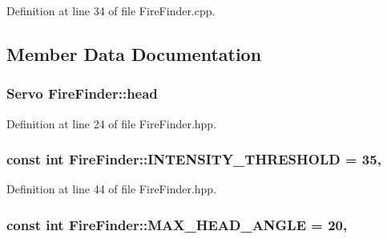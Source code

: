 Definition at line 34 of file Fire\-Finder.\-cpp.



\subsection{Member Data Documentation}
\hypertarget{classFireFinder_ac6a7b4e986e63cddb3f010e8909c00f8}{
\subsubsection[{head}]{\setlength{\rightskip}{0pt plus 5cm}Servo Fire\-Finder\-::head\hspace{0.3cm}{\ttfamily [private]}}}\label{classFireFinder_ac6a7b4e986e63cddb3f010e8909c00f8}


Definition at line 24 of file Fire\-Finder.\-hpp.

\hypertarget{classFireFinder_a0b9c6aa9ba75e2900477f94b02b2bb0b}{
\subsubsection[{I\-N\-T\-E\-N\-S\-I\-T\-Y\-\_\-\-T\-H\-R\-E\-S\-H\-O\-L\-D}]{\setlength{\rightskip}{0pt plus 5cm}const int Fire\-Finder\-::\-I\-N\-T\-E\-N\-S\-I\-T\-Y\-\_\-\-T\-H\-R\-E\-S\-H\-O\-L\-D = 35\hspace{0.3cm}{\ttfamily [static]}, {\ttfamily [private]}}}\label{classFireFinder_a0b9c6aa9ba75e2900477f94b02b2bb0b}


Definition at line 44 of file Fire\-Finder.\-hpp.

\hypertarget{classFireFinder_ace5a0c6c6435a4d36377dc94a5f785db}{
\subsubsection[{M\-A\-X\-\_\-\-H\-E\-A\-D\-\_\-\-A\-N\-G\-L\-E}]{\setlength{\rightskip}{0pt plus 5cm}const int Fire\-Finder\-::\-M\-A\-X\-\_\-\-H\-E\-A\-D\-\_\-\-A\-N\-G\-L\-E = 20\hspace{0.3cm}{\ttfamily [static]}, {\ttfamily [private]}}}\label{classFireFinder_ace5a0c6c6435a4d36377dc94a5f785db}


